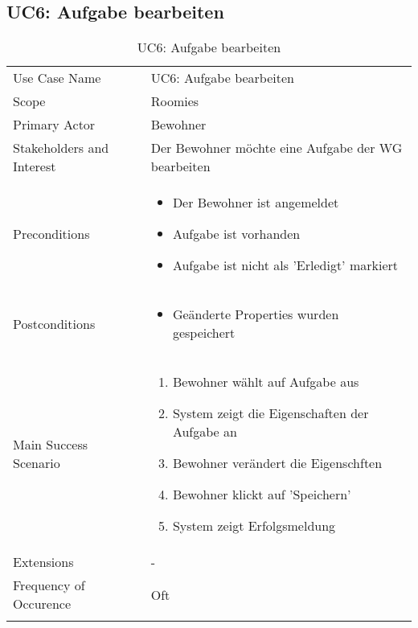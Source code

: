 \subsection{UC6: Aufgabe bearbeiten}
\begin{table}[H]
	\tablestyle
	\tablealtcolored
	\begin{tabularx}{\textwidth}{lX}
		\tablebody
			Use Case Name &
			UC6: Aufgabe bearbeiten
			\tabularnewline
			Scope &
			Roomies
			\tabularnewline
			Primary Actor &
			Bewohner
			\tabularnewline
			Stakeholders and Interest &
			Der Bewohner möchte eine Aufgabe der WG bearbeiten
			\tabularnewline
			Preconditions &
			\begin{itemize}
				\item Der Bewohner ist angemeldet
				\item Aufgabe ist vorhanden
				\item Aufgabe ist nicht als 'Erledigt' markiert
			\end{itemize}
			\tabularnewline
			Postconditions &
			\begin{itemize}
				\item Geänderte Properties wurden gespeichert
			\end{itemize}
			\tabularnewline
			Main Success Scenario &
			\begin{enumerate}
				\item Bewohner wählt auf Aufgabe aus
				\item System zeigt die Eigenschaften der Aufgabe an
				\item Bewohner verändert die Eigenschften
				\item Bewohner klickt auf 'Speichern'
				\item System zeigt Erfolgsmeldung
			\end{enumerate}
			\tabularnewline
			Extensions &
			-
			\tabularnewline
			Frequency of Occurence &
			Oft
			\tabularnewline
		\tableend
	\end{tabularx}
	\caption{UC6: Aufgabe bearbeiten}
\end{table}